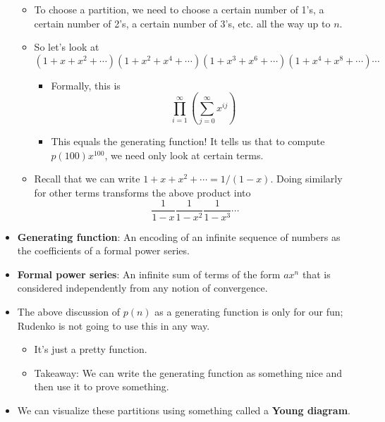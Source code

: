 \documentclass[../notes.tex]{subfiles}
\begin{document}
\begin{itemize}
\begin{itemize}
        \item To choose a partition, we need to choose a certain number of 1's, a certain number of 2's, a certain number of 3's, etc. all the way up to $n$.
        \item So let's look at
        \begin{equation*}
            (1+x+x^2+\cdots)(1+x^2+x^4+\cdots)(1+x^3+x^6+\cdots)(1+x^4+x^8+\cdots)\cdots
        \end{equation*}
        \begin{itemize}
            \item Formally, this is
            \begin{equation*}
                \prod_{i=1}^\infty\left( \sum_{j=0}^\infty x^{ij} \right)
            \end{equation*}
            \item This equals the generating function! It tells us that to compute $p(100)x^{100}$, we need only look at certain terms.
        \end{itemize}
        \item Recall that we can write $1+x+x^2+\cdots=1/(1-x)$. Doing similarly for other terms transforms the above product into
        \begin{equation*}
            \frac{1}{1-x}\frac{1}{1-x^2}\frac{1}{1-x^3}\cdots
        \end{equation*}
    \end{itemize}
    \item \textbf{Generating function}: An encoding of an infinite sequence of numbers as the coefficients of a formal power series.
    \item \textbf{Formal power series}: An infinite sum of terms of the form $ax^n$ that is considered independently from any notion of convergence.
    \item The above discussion of $p(n)$ as a generating function is only for our fun; Rudenko is not going to use this in any way.
    \begin{itemize}
        \item It's just a pretty function.
        \item Takeaway: We can write the generating function as something nice and then use it to prove something.
    \end{itemize}
    \item We can visualize these partitions using something called a \textbf{Young diagram}.
    \begin{figure}[h!]
        \centering

\end{figure}
\end{itemize}
\end{document}
